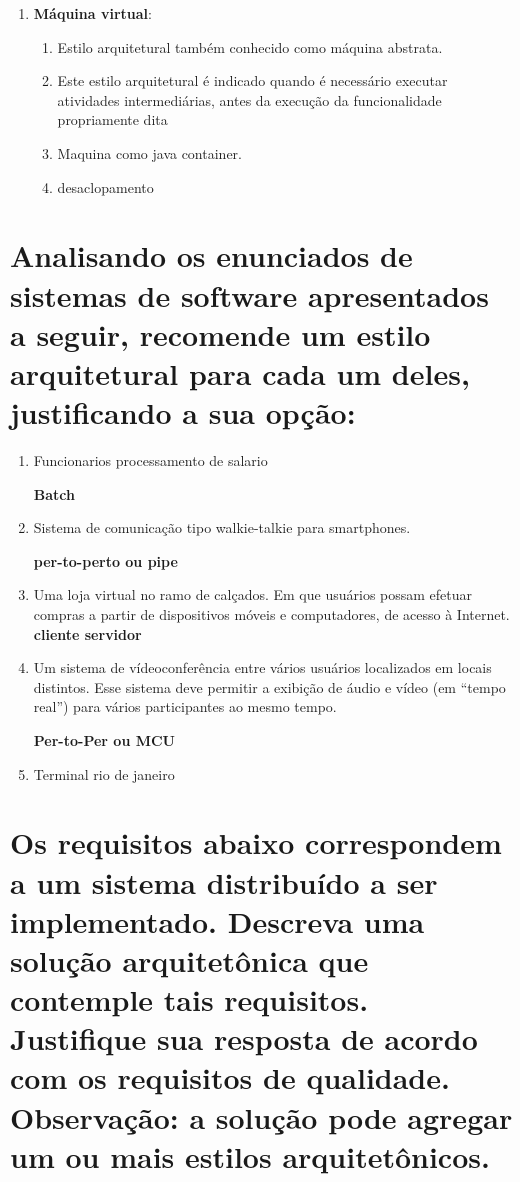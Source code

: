 \documentclass[12pt]{article}
\begin{document}
\begin{enumerate}
		
\item \textbf{Máquina virtual}:
\begin{enumerate}
\item Estilo arquitetural também conhecido como máquina abstrata. 
\item Este estilo arquitetural é indicado quando é necessário executar atividades intermediárias, antes da execução da funcionalidade propriamente dita
\item Maquina como java container.
\item desaclopamento 
\end{enumerate}
\end{enumerate}

\section{Analisando os enunciados de sistemas de software apresentados a seguir, recomende um
	estilo arquitetural para cada um deles, justificando a sua opção:}

\begin{enumerate}

	\item Funcionarios processamento de salario
	 
\textbf{		Batch}
	
	\item Sistema de comunicação tipo walkie-talkie para smartphones.
	
\textbf{		per-to-perto ou pipe}
	
	\item Uma loja virtual no ramo de calçados. Em que usuários possam efetuar compras a partir de dispositivos móveis e computadores, de acesso à Internet.
\textbf{	
	cliente servidor}
	
	\item Um sistema de vídeoconferência entre vários usuários localizados em locais distintos. Esse
	sistema deve permitir a exibição de áudio e vídeo (em “tempo real”) para vários participantes ao
	mesmo tempo.
	
\textbf{	Per-to-Per ou MCU}

\item Terminal rio de janeiro

\textbf{} 
\end{enumerate}



\section{Os requisitos abaixo correspondem a um sistema distribuído a ser implementado. Descreva
uma solução arquitetônica que contemple tais requisitos. Justifique sua resposta de acordo com os
requisitos de qualidade. Observação: a solução pode agregar um ou mais estilos arquitetônicos.}
\end{document}

